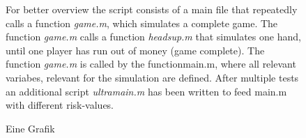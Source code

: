 \documentclass[11pt]{article}
\begin{document}
\begin{figure}[htbp]
\begin{minipage}{0.48\textwidth}
	\caption{Eine Grafik}
	\label{Bild} 
	\end{minipage}
	\begin{minipage}{0.48\textwidth} 
	For better overview the script consists of a main file that repeatedly calls a function \textit{game.m}, which simulates a complete game. The function \textit{game.m} calls a function \textit{headsup.m} that simulates one hand, until one player has run out of money (game complete). The function \textit{game.m} is called by the function{main.m}, where all relevant variabes, relevant for the simulation are defined.
After multiple tests an additional script \textit{ultramain.m} has been written to feed {main.m} with different risk-values.\\
	\end{minipage}
\end{figure}

%
\end{document}
